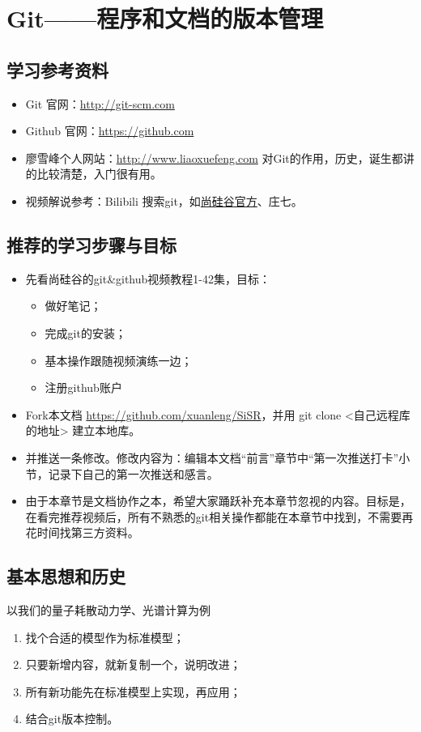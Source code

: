 \chapter{Git——程序和文档的版本管理}
\section{学习参考资料}
\begin{itemize}
\item Git 官网：\url{http://git-scm.com}

\item Github 官网：\url{https://github.com}

\item 廖雪峰个人网站：\url{http://www.liaoxuefeng.com} 对Git的作用，历史，诞生都讲的比较清楚，入门很有用。

\item 视频解说参考：Bilibili 搜索git，如\href{https://www.bilibili.com/video/BV1pW411A7a5?from=search&seid=3815767452396308043}{尚硅谷官方}、庄七。
\end{itemize}


\section{推荐的学习步骤与目标}
\begin{itemize}
\item 先看尚硅谷的git\&github视频教程1-42集，目标：
	\begin{itemize}
	\item 做好笔记；
	\item 完成git的安装；
	\item 基本操作跟随视频演练一边；
	\item 注册github账户
 	\end{itemize}
\item Fork本文档 \url{https://github.com/xuanleng/SiSR}，并用 git clone <自己远程库的地址> 建立本地库。
\item 并推送一条修改。修改内容为：编辑本文档“前言”章节中“第一次推送打卡”小节，记录下自己的第一次推送和感言。
\item 由于本章节是文档协作之本，希望大家踊跃补充本章节忽视的内容。目标是，在看完推荐视频后，所有不熟悉的git相关操作都能在本章节中找到，不需要再花时间找第三方资料。
\end{itemize}


\section{基本思想和历史}
以我们的量子耗散动力学、光谱计算为例
\begin{enumerate}
\item 找个合适的模型作为标准模型；
\item 只要新增内容，就新复制一个，说明改进；
\item 所有新功能先在标准模型上实现，再应用；
\item 结合git版本控制。
\end{enumerate}


